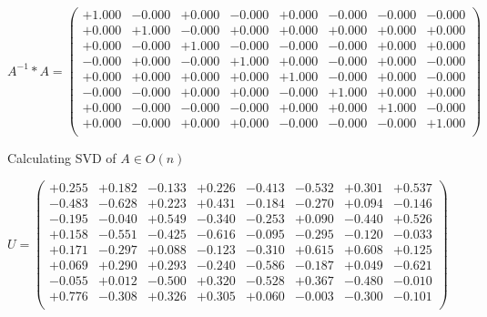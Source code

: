 \documentclass[9pt]{article}
\theoremstyle{plain}
\theoremstyle{definition}
\theoremstyle{remark}
\numberwithin{equation}{section}
\begin{document}
$A^{-1} *A = \left(
\begin{array}{
cccccccc}
+1.000 & -0.000 & +0.000 & -0.000 & +0.000 & -0.000 & -0.000 & -0.000 \\
+0.000 & +1.000 & -0.000 & +0.000 & +0.000 & +0.000 & +0.000 & +0.000 \\
+0.000 & -0.000 & +1.000 & -0.000 & -0.000 & -0.000 & +0.000 & +0.000 \\
-0.000 & +0.000 & -0.000 & +1.000 & +0.000 & -0.000 & +0.000 & -0.000 \\
+0.000 & +0.000 & +0.000 & +0.000 & +1.000 & -0.000 & +0.000 & -0.000 \\
-0.000 & -0.000 & +0.000 & +0.000 & -0.000 & +1.000 & +0.000 & +0.000 \\
+0.000 & -0.000 & -0.000 & -0.000 & +0.000 & +0.000 & +1.000 & -0.000 \\
+0.000 & -0.000 & +0.000 & +0.000 & -0.000 & -0.000 & -0.000 & +1.000 \\
\end{array}
\right)$ \newline 

Calculating SVD of  $A \in O(n)$

$U = \left(
\begin{array}{
cccccccc}
+0.255 & +0.182 & -0.133 & +0.226 & -0.413 & -0.532 & +0.301 & +0.537 \\
-0.483 & -0.628 & +0.223 & +0.431 & -0.184 & -0.270 & +0.094 & -0.146 \\
-0.195 & -0.040 & +0.549 & -0.340 & -0.253 & +0.090 & -0.440 & +0.526 \\
+0.158 & -0.551 & -0.425 & -0.616 & -0.095 & -0.295 & -0.120 & -0.033 \\
+0.171 & -0.297 & +0.088 & -0.123 & -0.310 & +0.615 & +0.608 & +0.125 \\
+0.069 & +0.290 & +0.293 & -0.240 & -0.586 & -0.187 & +0.049 & -0.621 \\
-0.055 & +0.012 & -0.500 & +0.320 & -0.528 & +0.367 & -0.480 & -0.010 \\
+0.776 & -0.308 & +0.326 & +0.305 & +0.060 & -0.003 & -0.300 & -0.101 \\
\end{array}
\right)$ \newline 
\end{document}
